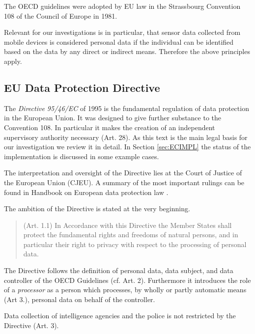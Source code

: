 The OECD guidelines were adopted by EU law in the Strassbourg Convention 108 of the Council of Europe \cite{CONV108} in 1981.

Relevant for our investigations is in particular, that sensor data collected from mobile devices is considered personal data if the individual can be identified based on the data by any direct or indirect means.
Therefore the above principles apply.


\subsection{EU Data Protection Directive}\label{EUDIR}

The \emph{Directive 95/46/EC} of 1995 \cite{DIR95} is the fundamental regulation of data protection in the European Union.
It was designed to give further substance to the Convention 108.
In particular it makes the creation of an independent supervisory authority necessary (Art. 28).
As this text is the main legal basis for our investigation we review it in detail.
In Section \ref{sec:ECIMPL} the status of the implementation is discussed in some example cases.

The interpretation and oversight of the Directive lies at the Court of Justice of the European Union (CJEU).
A summary of the most important rulings can be found in Handbook on European data protection law \cite{EU_HANDBOOK_2014}.

The ambition of the Directive is stated at the very beginning.
\begin{quote}
  (Art. 1.1) In Accordance with this Directive the Member States shall protect the fundamental rights and freedoms of natural persons, and in particular their right to privacy with respect to the processing of personal data.
\end{quote}

The Directive follows the definition of personal data, data subject, and data controller of the OECD Guidelines (cf. Art. 2).
Furthermore it introduces the role of a \emph{processor} as a person which processes, by wholly or partly automatic means (Art 3.), personal data on behalf of the controller.

Data collection of intelligence agencies and the police is not restricted by the Directive (Art. 3).

